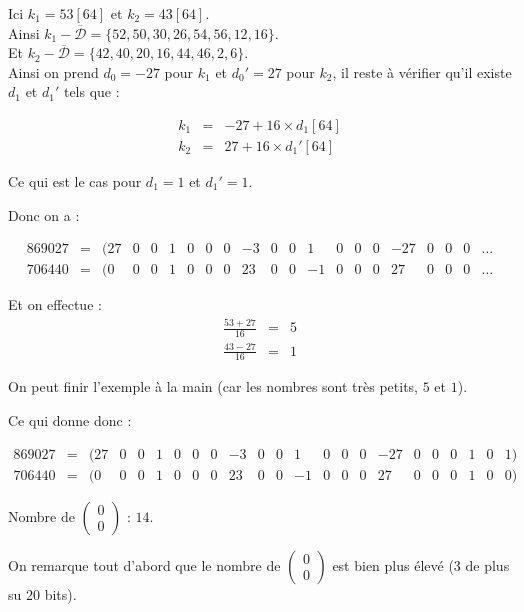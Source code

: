 \documentclass[12pt, a4paper]{memoir}
\newcommand{\doublezero}{\begin{pmatrix} 0 \\ 0 \end{pmatrix}}
\newcommand{\dbarre}{\overline{\mathcal{D}}}
\begin{document}
  Ici $k_1 = 53 [64]$ et $k_2 = 43 [64]$. \\
Ainsi  $k_1 - \dbarre = \{52,50,30,26,54,56,12,16\}$. \\
Et  $k_2 - \dbarre = \{42,40,20,16,44,46,2,6\}$. \\ 
 Ainsi on prend $d_0 = -27$ pour $k_1$ et $d_0' = 27$ pour $k_2$, il reste à vérifier qu'il existe $d_1$ et 
$d_1'$ tels que :

   $$\begin{array}{ccc}
k_1 & = & -27 + 16 \times d_1[64] \\
k_2 & = & 27 + 16 \times d_1'[64]
 \end{array}$$
 
Ce qui est le cas pour $d_1 = 1$ et $d_1' = 1$.

 Donc on a :
 
 $$\begin{array}{ccccccccccccccccccccc}
  869027 & = & (27 & 0 & 0 & 1 & 0 & 0 & 0 & -3 & 0 & 0 & 1 & 0 & 0 & 0 & -27 & 0 & 0 & 0 & \ldots \\
  706440 & = & (0 & 0 & 0 & 1 & 0 & 0 & 0 & 23 & 0 & 0 & -1 & 0 & 0 & 0 & 27 & 0 & 0 & 0 & \ldots
 \end{array}$$
 
 Et on effectue :
 $$\begin{array}{cccccc}
  \frac{53 + 27}{16} & = & 5 \\
  \frac{43 - 27}{16} & = & 1
 \end{array}$$
 
 On peut finir l'exemple à la main (car les nombres sont très petits, $5$ et $1$).
 
 Ce qui donne donc :
 
  $$\begin{array}{ccccccccccccccccccccccc}
  869027 & = & (27 & 0 & 0 & 1 & 0 & 0 & 0 & -3 & 0 & 0 & 1 & 0 & 0 & 0 & -27 & 0 & 0 & 0 & 1 & 0 & 1) \\
  706440 & = & (0 & 0 & 0 & 1 & 0 & 0 & 0 & 23 & 0 & 0 & -1 & 0 & 0 & 0 & 27 & 0 & 0 & 0 & 1 & 0 & 0)
 \end{array}$$
 
  Nombre de $\doublezero$ : $14$.
  
  On remarque tout d'abord que le nombre de $\doublezero$ est bien plus élevé ($3$ de plus su $20$ bits).
  
\end{document}

